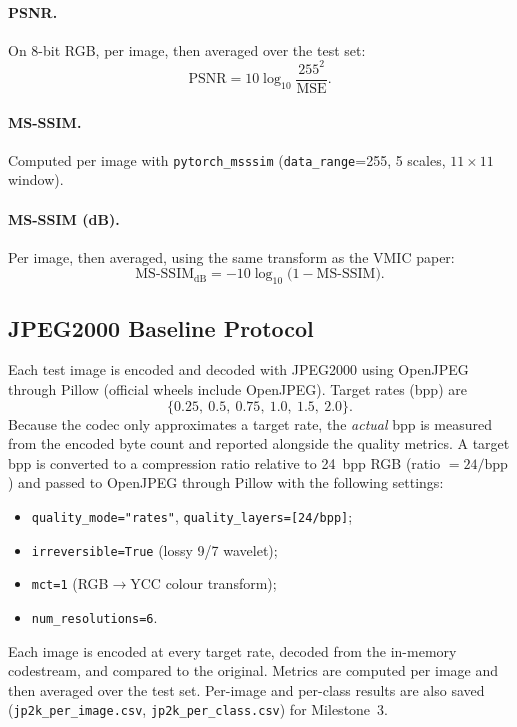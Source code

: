 \documentclass[11pt]{article}
\begin{document}
\paragraph{PSNR.} On 8-bit RGB, per image, then averaged over the test set:
\begin{equation}
  \mathrm{PSNR} = 10\log_{10}\frac{255^2}{\mathrm{MSE}}.
\end{equation}
 
\paragraph{MS-SSIM.} Computed per image with \texttt{pytorch\_msssim} (\texttt{data\_range}=255, 5 scales, $11\times11$ window).
 
\paragraph{MS-SSIM (dB).} Per image, then averaged, using the same transform as the VMIC paper:
\begin{equation}
  \mathrm{MS\text{-}SSIM_{dB}} = -10\log_{10}\bigl(1-\mathrm{MS\text{-}SSIM}\bigr).
\end{equation}
 
\subsection{JPEG2000 Baseline Protocol}
Each test image is encoded and decoded with JPEG2000 using OpenJPEG through Pillow (official wheels include OpenJPEG). Target rates (bpp) are
\[
  \{0.25,\ 0.5,\ 0.75,\ 1.0,\ 1.5,\ 2.0\}.
\]
Because the codec only approximates a target rate, the \emph{actual} bpp is measured from the encoded byte count and reported alongside the quality metrics. A target bpp is converted to a compression ratio relative to 24~bpp RGB (ratio $=24/\text{bpp}$) and passed to OpenJPEG through Pillow with the following settings:
\begin{itemize}
  \item \texttt{quality\_mode="rates"}, \texttt{quality\_layers=[24/bpp]};
  \item \texttt{irreversible=True} (lossy 9/7 wavelet);
  \item \texttt{mct=1} (RGB$\to$YCC colour transform);
  \item \texttt{num\_resolutions=6}.
\end{itemize}
Each image is encoded at every target rate, decoded from the in-memory codestream, and compared to the original. Metrics are computed per image and then averaged over the test set. Per-image and per-class results are also saved (\texttt{jp2k\_per\_image.csv}, \texttt{jp2k\_per\_class.csv}) for Milestone~3.
\end{document}

